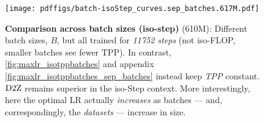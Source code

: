 \begin{figure}
  \centering
  \texttt{[image: pdffigs/batch-isoStep\_curves.sep\_batches.617M.pdf]}
  \mbox{}
  \vspace{-4mm}
  \mbox{}
  \caption{\textbf{Comparison across batch sizes (iso-step)} (610M):
    Different batch sizes, $B$, but all trained for \emph{11752 steps}
    (not iso-FLOP, smaller batches see fewer TPP).  In contrast,
    \cref{fig:maxlr_isotppbatches} and appendix
    \cref{fig:maxlr_isotppbatches_sep_batches} instead keep \emph{TPP}
    constant. $\mbox{D2Z}$ remains superior in the iso-Step context.  More
    interestingly, here the optimal LR actually \emph{increases} as
    batches --- and, correspondingly, the \emph{datasets} --- increase
    in size.\label{fig:maxlr_isostepbatches}}
\end{figure}
